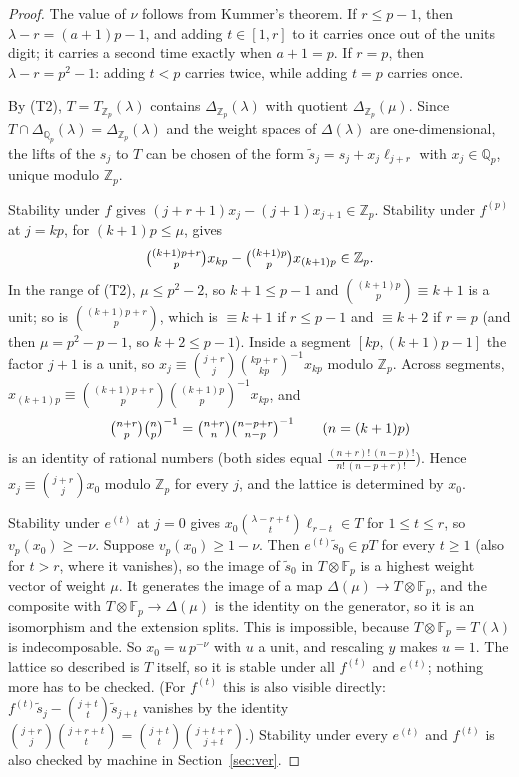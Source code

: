 \documentclass[10pt]{article}
\theoremstyle{ds}
\theoremstyle{dsrem}
\newcommand{\Z}{\mathbb{Z}}
\newcommand{\Q}{\mathbb{Q}}
\newcommand{\F}{\mathbb{F}}
\begin{document}
\begin{proof}
The value of $\nu$ follows from Kummer's theorem. If $r\le p-1$, then $\lambda-r=(a+1)p-1$, and adding $t\in[1,r]$ to it carries once out of the units digit; it carries a second time exactly when $a+1=p$. If $r=p$, then $\lambda-r=p^2-1$: adding $t<p$ carries twice, while adding $t=p$ carries once.

By (T2), $T=T_{\Z_p}(\lambda)$ contains $\Delta_{\Z_p}(\lambda)$ with quotient $\Delta_{\Z_p}(\mu)$. Since $T\cap\Delta_{\Q_p}(\lambda)=\Delta_{\Z_p}(\lambda)$ and the weight spaces of $\Delta(\lambda)$ are one-dimensional, the lifts of the $s_j$ to $T$ can be chosen of the form $\tilde s_j=s_j+x_j\ell_{j+r}$ with $x_j\in\Q_p$, unique modulo $\Z_p$.

Stability under $f$ gives $(j+r+1)x_j-(j+1)x_{j+1}\in\Z_p$. Stability under $f^{(p)}$ at $j=kp$, for $(k+1)p\le\mu$, gives
\[\tbinom{(k+1)p+r}{p}x_{kp}-\tbinom{(k+1)p}{p}x_{(k+1)p}\in\Z_p.\]
In the range of (T2), $\mu\le p^2-2$, so $k+1\le p-1$ and $\binom{(k+1)p}{p}\equiv k+1$ is a unit; so is $\binom{(k+1)p+r}{p}$, which is $\equiv k+1$ if $r\le p-1$ and $\equiv k+2$ if $r=p$ (and then $\mu=p^2-p-1$, so $k+2\le p-1$). Inside a segment $[kp,(k+1)p-1]$ the factor $j+1$ is a unit, so $x_j\equiv\binom{j+r}{j}\binom{kp+r}{kp}^{-1}x_{kp}$ modulo $\Z_p$. Across segments, $x_{(k+1)p}\equiv\binom{(k+1)p+r}{p}\binom{(k+1)p}{p}^{-1}x_{kp}$, and
\[\tbinom{n+r}{p}\tbinom np^{-1}=\tbinom{n+r}{n}\tbinom{n-p+r}{n-p}^{-1}\qquad(n=(k+1)p)\]
is an identity of rational numbers (both sides equal $\frac{(n+r)!\,(n-p)!}{n!\,(n-p+r)!}$). Hence $x_j\equiv\binom{j+r}{j}x_0$ modulo $\Z_p$ for every $j$, and the lattice is determined by $x_0$.

Stability under $e^{(t)}$ at $j=0$ gives $x_0\binom{\lambda-r+t}{t}\ell_{r-t}\in T$ for $1\le t\le r$, so $v_p(x_0)\ge-\nu$. Suppose $v_p(x_0)\ge1-\nu$. Then $e^{(t)}\tilde s_0\in pT$ for every $t\ge1$ (also for $t>r$, where it vanishes), so the image of $\tilde s_0$ in $T\otimes\F_p$ is a highest weight vector of weight $\mu$. It generates the image of a map $\Delta(\mu)\to T\otimes\F_p$, and the composite with $T\otimes\F_p\to\Delta(\mu)$ is the identity on the generator, so it is an isomorphism and the extension splits. This is impossible, because $T\otimes\F_p=T(\lambda)$ is indecomposable. So $x_0=u\,p^{-\nu}$ with $u$ a unit, and rescaling $y$ makes $u=1$. The lattice so described is $T$ itself, so it is stable under all $f^{(t)}$ and $e^{(t)}$; nothing more has to be checked. (For $f^{(t)}$ this is also visible directly: $f^{(t)}\tilde s_j-\binom{j+t}{t}\tilde s_{j+t}$ vanishes by the identity $\binom{j+r}{j}\binom{j+r+t}{t}=\binom{j+t}{t}\binom{j+t+r}{j+t}$.) Stability under every $e^{(t)}$ and $f^{(t)}$ is also checked by machine in Section~\ref{sec:ver}.
\end{proof}
\end{document}
